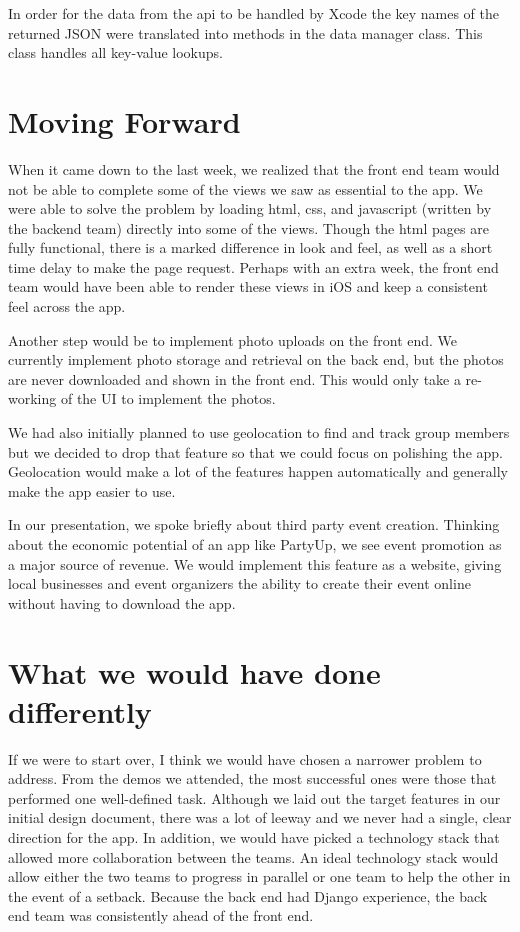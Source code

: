 \documentclass[12pt]{article}
\begin{document}
\bigskip

In order for the data from the api to be handled by Xcode the key names of the returned JSON were translated into methods in the data manager class. This class handles all key-value lookups. 

\section{Moving Forward}

When it came down to the last week, we realized that the front end team would not be able to complete some of the views we saw as essential to the app. 
We were able to solve the problem by loading html, css, and javascript (written by the backend team) directly into some of the views. 
Though the html pages are fully functional, there is a marked difference in look and feel, as well as a short time delay to make the page request. 
Perhaps with an extra week, the front end team would have been able to render these views in iOS and keep a consistent feel across the app. 

\bigskip

Another step would be to implement photo uploads on the front end.
We currently implement photo storage and retrieval on the back end, but the photos are never downloaded and shown in the front end.
This would only take a re-working of the UI to implement the photos.

\bigskip

We had also initially planned to use geolocation to find and track group members but we decided to drop that feature so that we could focus on polishing the app. 
Geolocation would make a lot of the features happen automatically and generally make the app easier to use. 

\bigskip

In our presentation, we spoke briefly about third party event creation. 
Thinking about the economic potential of an app like PartyUp, we see event promotion as a major source of revenue. 
We would implement this feature as a website, giving local businesses and event organizers the ability to create their event online without having to download the app.

\bigskip

\section{What we would have done differently}

If we were to start over, I think we would have chosen a narrower problem to address. 
From the demos we attended, the most successful ones were those that performed one well-defined task. 
Although we laid out the target features in our initial design document, there was a lot of leeway and we never had a single, clear direction for the app.
In addition, we would have picked a technology stack that allowed more collaboration between the teams.
An ideal technology stack would allow either the two teams to progress in parallel or one team to help the other in the event of a setback. 
Because the back end had Django experience, the back end team was consistently ahead of the front end.
\end{document}
